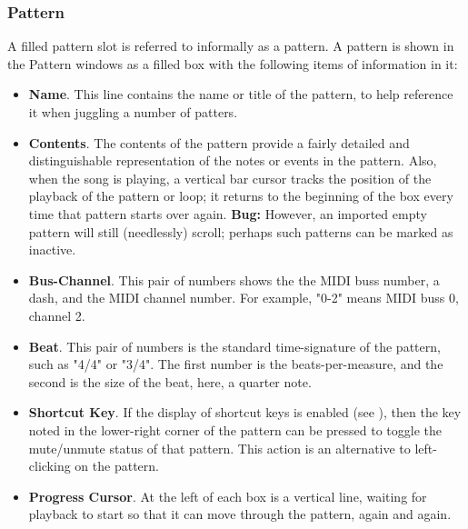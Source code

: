 \subsubsection{Pattern}
\label{subsubsec:seq24_patterns_pattern_filled}

   A filled pattern slot is referred to informally as a pattern.
   A pattern is shown in the Pattern windows as a filled box with the
   following items of information in it:

   \begin{itemize}
      \item \textbf{Name}.
         This line contains the name or title of the pattern, to help
         reference it when juggling a number of patters.
      \item \textbf{Contents}.
         The contents of the pattern provide a fairly detailed and
         distinguishable representation of the notes or events in the
         pattern.  Also, when the song is playing, a vertical bar cursor
         tracks the position of the playback of the pattern or loop; it
         returns to the beginning of the box every time that pattern starts
         over again.
         \textbf{Bug:}
         However, an imported empty pattern will still (needlessly) scroll;
         perhaps such patterns can be marked as inactive.
      \item \textbf{Bus-Channel}.
         This pair of numbers shows the the MIDI buss number, a dash, and
         the MIDI channel number.
         For example, "0-2" means MIDI buss 0, channel 2.
      \item \textbf{Beat}.
         This pair of numbers is the standard time-signature of the pattern,
         such as "4/4" or "3/4".  The first number is the beats-per-measure,
         and the second is the size of the beat, here, a quarter note.
      \item \textbf{Shortcut Key}.
         If the display of shortcut keys is enabled (see
         ),
         then the key noted in the lower-right corner of the pattern can be
         pressed to toggle the mute/unmute status of that pattern.
         This action is an alternative to left-clicking on the pattern.
      \item \textbf{Progress Cursor}.
         At the left of each box is a vertical line, waiting for playback to
         start so that it can move through the pattern, again and again.
   \end{itemize}

